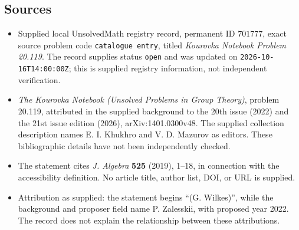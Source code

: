 \documentclass[11pt]{article}
\begin{document}
\subsection{Sources}
\begin{itemize}
\item Supplied local UnsolvedMath registry record, permanent ID \(701777\), exact source problem code \texttt{catalogue entry}, titled \emph{Kourovka Notebook Problem 20.119}. The record supplies status \texttt{open} and was updated on \texttt{2026-10-16T14:00:00Z}; this is supplied registry information, not independent verification.
\item \emph{The Kourovka Notebook (Unsolved Problems in Group Theory)}, problem 20.119, attributed in the supplied background to the 20th issue (2022) and the 21st issue edition (2026), arXiv:1401.0300v48. The supplied collection description names E. I. Khukhro and V. D. Mazurov as editors. These bibliographic details have not been independently checked.
\item The statement cites \emph{J. Algebra} \textbf{525} (2019), 1--18, in connection with the accessibility definition. No article title, author list, DOI, or URL is supplied.
\item Attribution as supplied: the statement begins ``(G. Wilkes)'', while the background and proposer field name P. Zalesskii, with proposed year 2022. The record does not explain the relationship between these attributions.
\end{itemize}
\end{document}
